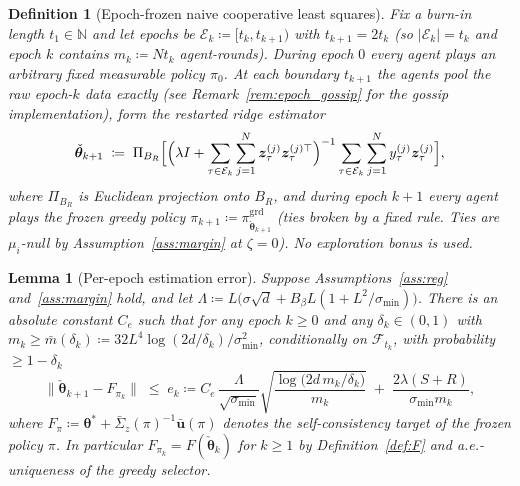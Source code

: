\documentclass[11pt]{article}
\newtheorem{lemma}[theorem]{Lemma}
\newtheorem{definition}[theorem]{Definition}
\begin{document}
\begin{definition}[Epoch-frozen naive cooperative least squares]
\label{def:epoch_alg}
Fix a burn-in length $t_1\in\mathbb N$ and let epochs be
$\mathcal E_k\coloneqq[t_k,t_{k+1})$ with $t_{k+1}=2t_k$ (so
$|\mathcal E_k|=t_k$ and epoch $k$ contains $m_k\coloneqq Nt_k$
agent-rounds).  During epoch $0$ every agent plays an arbitrary fixed
measurable policy $\pi_0$.  At each boundary $t_{k+1}$ the agents pool
the raw epoch-$k$ data exactly (see
Remark~\ref{rem:epoch_gossip} for the gossip implementation), form
the \emph{restarted} ridge estimator
\[
\check{\bm\theta}_{k+1}\;\coloneqq\;
\Pi_{B_R}\Bigl[\Bigl(\lambda I+\sum_{\tau\in\mathcal E_k}\sum_{j=1}^N
\bm z_\tau^{(j)}\bm z_\tau^{(j)\top}\Bigr)^{-1}
\sum_{\tau\in\mathcal E_k}\sum_{j=1}^N y_\tau^{(j)}\bm z_\tau^{(j)}\Bigr],
\]
where $\Pi_{B_R}$ is Euclidean projection onto $B_R$, and during epoch
$k+1$ every agent plays the \emph{frozen greedy} policy
$\pi_{k+1}\coloneqq\pi^{\mathrm{grd}}_{\check{\bm\theta}_{k+1}}$
(ties broken by a fixed rule. Ties are $\mu_i$-null by
Assumption~\ref{ass:margin} at $\zeta=0$).  No exploration bonus is
used.
\end{definition}

\begin{lemma}[Per-epoch estimation error]\label{lem:epoch_est}
Suppose Assumptions~\ref{ass:reg} and~\ref{ass:margin} hold, and let
$\Lambda\coloneqq
L\bigl(\sigma\sqrt d+B_\beta L(1+L^2/\sigma_{\min})\bigr)$.
There is an absolute constant $C_e$ such that for any epoch $k\geq 0$
and any $\delta_k\in(0,1)$ with
$m_k\geq \bar m(\delta_k)\coloneqq
32L^4\log(2d/\delta_k)/\sigma_{\min}^2$, conditionally on
$\mathcal F_{t_k}$, with probability $\geq 1-\delta_k$ \[
\bigl\|\check{\bm\theta}_{k+1}-F_{\pi_k}\bigr\|
\;\leq\;e_k\coloneqq
C_e\,\frac{\Lambda}{\sqrt{\sigma_{\min}}}
\sqrt{\frac{\log\bigl(2d\,m_k/\delta_k\bigr)}{m_k}}
\;+\;\frac{2\lambda(S+R)}{\sigma_{\min}m_k},
\]
where
$F_{\pi}\coloneqq\bm\theta^{\!*}+\bar\Sigma_z(\pi)^{-1}\bar{\bm u}(\pi)$
denotes the self-consistency target of the frozen policy $\pi$. In
particular $F_{\pi_k}=F(\check{\bm\theta}_k)$ for $k\geq 1$ by
Definition~\ref{def:F} and a.e.-uniqueness of the greedy selector.
\end{lemma}
\end{document}
